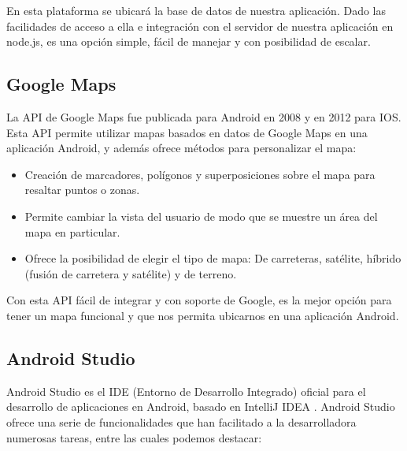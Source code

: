 En esta plataforma se ubicará la base de datos de nuestra aplicación. Dado las facilidades de acceso a ella e integración con el servidor de nuestra aplicación en node.js, es una opción simple, fácil de manejar y con posibilidad de escalar.

\subsection{ Google Maps }

La API de Google Maps \cite{URL::GoogleMapsApi} fue publicada para Android en 2008 y en 2012 para IOS. Esta API permite utilizar mapas basados en datos de Google Maps en una aplicación Android, y además ofrece métodos para personalizar el mapa:
\begin{itemize}
    \item Creación de marcadores, polígonos y superposiciones sobre el mapa para resaltar puntos o zonas. 
    \item Permite cambiar la vista del usuario de modo que se muestre un área del mapa en particular. 
    \item Ofrece la posibilidad de elegir el tipo de mapa: De carreteras, satélite, híbrido (fusión de carretera y satélite) y de terreno.
\end{itemize}

Con esta API fácil de integrar y con soporte de Google, es la mejor opción para tener un mapa funcional y que nos permita ubicarnos en una aplicación Android.



\subsection{Android Studio}

Android Studio \cite{URL::AndroidStudio} es el IDE \cite{URL::IDE} (Entorno de Desarrollo Integrado) oficial para el desarrollo de aplicaciones en Android, basado en IntelliJ IDEA \cite{URL::IntelliJIDEA}. Android Studio ofrece una serie de funcionalidades que han facilitado a la desarrolladora numerosas tareas, entre las cuales podemos destacar:

